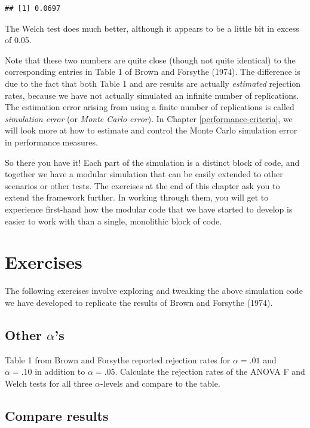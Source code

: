 \documentclass[
]{book}
\begin{document}
\begin{verbatim}
## [1] 0.0697
\end{verbatim}

The Welch test does much better, although it appears to be a little bit in excess of 0.05.

Note that these two numbers are quite close (though not quite identical) to the corresponding entries in Table 1 of Brown and Forsythe (1974). The difference is due to the fact that both Table 1 and are results are actually \emph{estimated} rejection rates, because we have not actually simulated an infinite number of replications. The estimation error arising from using a finite number of replications is called \emph{simulation error} (or \emph{Monte Carlo error}).
In Chapter \ref{performance-criteria}, we will look more at how to estimate and control the Monte Carlo simulation error in performance measures.

So there you have it! Each part of the simulation is a distinct block of code, and together we have a modular simulation that can be easily extended to other scenarios or other tests.
The exercises at the end of this chapter ask you to extend the framework further.
In working through them, you will get to experience first-hand how the modular code that we have started to develop is easier to work with than a single, monolithic block of code.

\section{Exercises}\label{exAnovaExercises}

The following exercises involve exploring and tweaking the above simulation code we have developed to replicate the results of Brown and Forsythe (1974).

\subsection{\texorpdfstring{Other \(\alpha\)'s}{Other \textbackslash alpha's}}\label{BF-other-alphas}

Table 1 from Brown and Forsythe reported rejection rates for \(\alpha = .01\) and \(\alpha = .10\) in addition to \(\alpha = .05\). Calculate the rejection rates of the ANOVA F and Welch tests for all three \(\alpha\)-levels and compare to the table.

\subsection{Compare results}\label{BF-compare-results}
\end{document}
